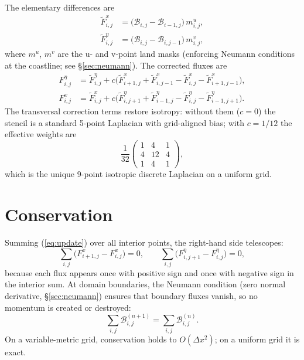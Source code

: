 \documentclass[11pt]{article}
\begin{document}
The elementary differences are
\begin{align}
  \widetilde{F}^x_{i,j}    &= \bigl(\mathcal{B}_{i,j} - \mathcal{B}_{i-1,j}\bigr)\,m^u_{i,j}, \\
  \widetilde{F}^\eta_{i,j} &= \bigl(\mathcal{B}_{i,j} - \mathcal{B}_{i,j-1}\bigr)\,m^v_{i,j},
\end{align}
where $m^u$, $m^v$ are the u- and v-point land masks (enforcing Neumann conditions
at the coastline; see \S\ref{sec:neumann}). The corrected fluxes are
\begin{align}
  F^\eta_{i,j} &= \widetilde{F}^\eta_{i,j}
    + c\bigl(\widetilde{F}^x_{i+1,j} + \widetilde{F}^x_{i,j-1}
            - \widetilde{F}^x_{i,j}   - \widetilde{F}^x_{i+1,j-1}\bigr), \\
  F^x_{i,j}   &= \widetilde{F}^x_{i,j}
    + c\bigl(\widetilde{F}^\eta_{i,j+1} + \widetilde{F}^\eta_{i-1,j}
            - \widetilde{F}^\eta_{i,j}   - \widetilde{F}^\eta_{i-1,j+1}\bigr).
\end{align}
The transversal correction terms restore isotropy: without them ($c=0$) the
stencil is a standard 5-point Laplacian with grid-aligned bias; with $c=1/12$
the effective weights are
\[
\frac{1}{32}\begin{pmatrix} 1 & 4 & 1 \\ 4 & 12 & 4 \\ 1 & 4 & 1 \end{pmatrix},
\]
which is the unique 9-point isotropic discrete Laplacian on a uniform grid.

\section{Conservation}

Summing (\ref{eq:update}) over all interior points, the right-hand side telescopes:
\begin{equation}
  \sum_{i,j} \bigl(F^x_{i+1,j} - F^x_{i,j}\bigr) = 0, \qquad
  \sum_{i,j} \bigl(F^\eta_{i,j+1} - F^\eta_{i,j}\bigr) = 0,
\end{equation}
because each flux appears once with positive sign and once with negative sign
in the interior sum. At domain boundaries, the Neumann condition
(zero normal derivative, \S\ref{sec:neumann}) ensures that boundary fluxes
vanish, so no momentum is created or destroyed:
\begin{equation}
  \sum_{i,j} \mathcal{B}_{i,j}^{(n+1)} = \sum_{i,j} \mathcal{B}_{i,j}^{(n)}.
\end{equation}
On a variable-metric grid, conservation holds to $O(\Delta x^2)$; on a
uniform grid it is exact.
\end{document}
